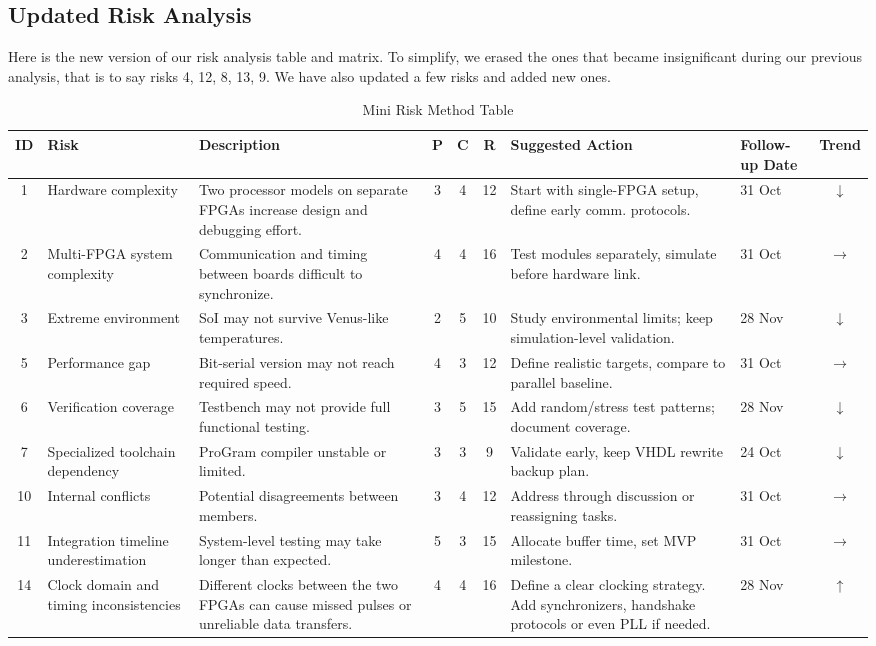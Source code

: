 \documentclass[10pt]{article}
\begin{document}
\subsection{Updated Risk Analysis}
Here is the new version of our risk analysis table and matrix. To simplify, we erased the ones that became insignificant during our previous analysis, that is to say risks 4, 12, 8, 13, 9. We have also updated a few risks and added new ones.
\begin{table}[h!]
\centering
\begin{tabular}{|c|p{2.35cm}|p{4.1cm}|c|c|c|p{4.3cm}|p{1.17cm}|c|}
\hline
\textbf{ID} & \textbf{Risk} & \textbf{Description} & \textbf{P} & \textbf{C} & \textbf{R} & \textbf{Suggested Action} & \textbf{Follow-up Date} & \textbf{Trend} \\
\hline
1 & Hardware complexity & Two processor models on separate FPGAs increase design and debugging effort. & 3 & 4 & 12 & Start with single-FPGA setup, define early comm. protocols. & 31 Oct & $\downarrow$ \\
\hline
2 & Multi-FPGA system complexity & Communication and timing between boards difficult to synchronize. & 4 & 4 & 16 & Test modules separately, simulate before hardware link. & 31 Oct & $\rightarrow$ \\
\hline
3 & Extreme environment & SoI may not survive Venus-like temperatures. & 2 & 5 & 10 & Study environmental limits; keep simulation-level validation. & 28 Nov & $\downarrow$ \\
\hline
5 & Performance gap & Bit-serial version may not reach required speed. & 4 & 3 & 12 & Define realistic targets, compare to parallel baseline. & 31 Oct & $\rightarrow$ \\
\hline
6 & Verification coverage & Testbench may not provide full functional testing. & 3 & 5 & 15 & Add random/stress test patterns; document coverage. & 28 Nov & $\downarrow$ \\
\hline
7 & Specialized toolchain dependency & ProGram compiler unstable or limited. & 3 & 3 & 9 & Validate early, keep VHDL rewrite backup plan. & 24 Oct & $\downarrow$ \\
\hline
10 & Internal conflicts & Potential disagreements between members. & 3 & 4 & 12 & Address through discussion or reassigning tasks. & 31 Oct & $\rightarrow$ \\
\hline
11 & Integration timeline underestimation & System-level testing may take longer than expected. & 5 & 3 & 15 & Allocate buffer time, set MVP milestone. & 31 Oct & $\rightarrow$ \\
\hline
14 & Clock domain and timing inconsistencies & Different clocks between the two FPGAs can cause missed pulses or unreliable data transfers. & 4 & 4 & 16 & Define a clear clocking strategy. Add synchronizers, handshake protocols or even PLL if needed. & 28 Nov & $\uparrow$ \\
\hline
\end{tabular}
\caption{Mini Risk Method Table}
\end{table}
\end{document}

